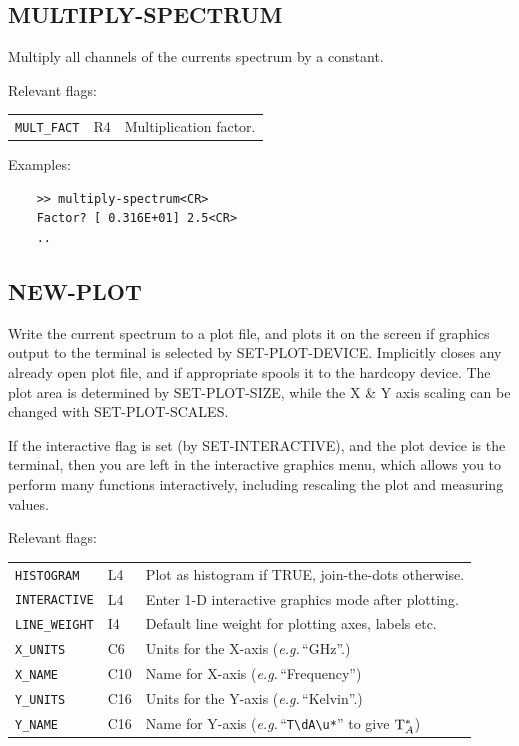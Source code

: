 \documentclass[11pt,twoside]{report}
\newcommand{\eg}{{\it e.g.\,}}
\begin{document}
\subsection{MULTIPLY-SPECTRUM} 

Multiply all channels of the currents spectrum by a constant.

Relevant flags:\\
\begin{tabular}{lll}
  \verb+MULT_FACT+ & R4 & Multiplication factor.
\end{tabular}

Examples:
\begin{verbatim}
    >> multiply-spectrum<CR>
    Factor? [ 0.316E+01] 2.5<CR>
    ..
\end{verbatim}

\subsection{NEW-PLOT} 

Write the current spectrum to a plot file, and plots it on the screen if
graphics output to the terminal is selected by SET-PLOT-DEVICE.
  
Implicitly closes any already open plot file, and if appropriate spools it to
the hardcopy device. The plot area is determined by SET-PLOT-SIZE, while the
X \& Y axis scaling can be changed with SET-PLOT-SCALES.

If the interactive flag is set (by SET-INTERACTIVE), and the plot device is
the terminal, then you are left in the interactive graphics menu, which
allows you to perform many functions interactively, including rescaling the
plot and measuring values.

Relevant flags:\\
\begin{tabular}{lll}
  \verb+HISTOGRAM+   & L4 & Plot as histogram if TRUE, join-the-dots otherwise.\\
  \verb+INTERACTIVE+ & L4 & Enter 1-D interactive graphics mode after
                            plotting.\\
  \verb+LINE_WEIGHT+ & I4  & Default line weight for plotting axes, labels etc.\\
  \verb+X_UNITS+     & C6 & Units for the X-axis (\eg ``GHz''.)\\
  \verb+X_NAME+      & C10 & Name for X-axis (\eg ``Frequency'')\\
  \verb+Y_UNITS+     & C16 & Units for the Y-axis (\eg ``Kelvin''.)\\
  \verb+Y_NAME+      & C16 & Name for Y-axis (\eg ``\verb+T\dA\u*+'' to
                             give ${\rm T}_A^*$)
\end{tabular}
\end{document}

